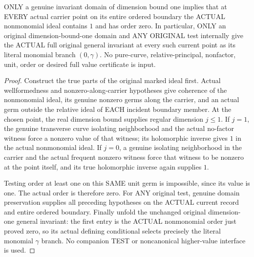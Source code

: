 \begin{theorem}
\label{hir:original-curve-domain-boundary-nonmonomial-unit}
\leanok
ONLY a genuine invariant domain of dimension bound one implies that at
EVERY actual carrier point on its entire ordered boundary the ACTUAL
nonmonomial ideal contains $1$ and has order zero. In particular, ONLY
an original dimension-bound-one domain and ANY ORIGINAL test internally
give the ACTUAL full original general invariant at every such current
point as its literal monomial branch $(0,\gamma)$.
No pure-curve, relative-principal, nonfactor, unit, order or desired full
value certificate is input.
\end{theorem}
\begin{proof}
Construct the true parts of the original marked ideal first. Actual
wellformedness and nonzero-along-carrier hypotheses give coherence of the
nonmonomial ideal, its genuine nonzero germs along the carrier, and an
actual germ outside the relative ideal of EACH incident boundary member.
At the chosen point, the real dimension bound supplies regular dimension
$j\leq1$. If $j=1$, the genuine transverse curve isolating neighborhood
and the actual no-factor witness force a nonzero value of that witness;
its holomorphic inverse gives $1$ in the actual nonmonomial ideal.
If $j=0$, a genuine isolating neighborhood in the carrier and the actual
frequent nonzero witness force that witness to be nonzero at the point
itself, and its true holomorphic inverse again supplies $1$.

Testing order at least one on this SAME unit germ is impossible, since
its value is one. The actual order is therefore zero. For ANY original
test, genuine domain preservation supplies all preceding hypotheses on
the ACTUAL current record and entire ordered boundary. Finally unfold
the unchanged original dimension-one general invariant: the first entry
is the ACTUAL nonmonomial order just proved zero, so its actual defining
conditional selects precisely the literal monomial $\gamma$ branch.
No companion TEST or noncanonical higher-value interface is used.
\end{proof}

